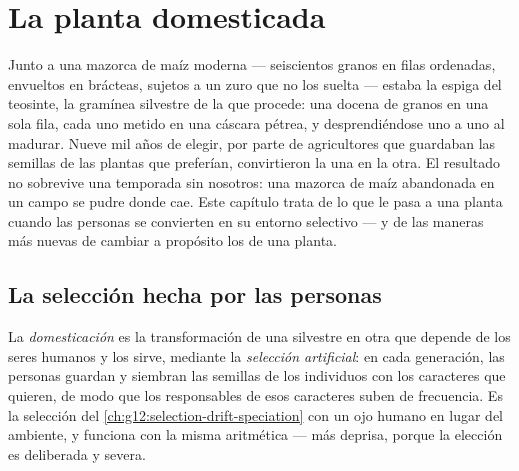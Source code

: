 \chapter{La planta domesticada}\label{ch:g12:domesticated-plants}

Junto a una mazorca de maíz moderna --- seiscientos granos en filas
ordenadas, envueltos en brácteas, sujetos a un zuro que no los suelta
--- estaba la espiga del teosinte, la gramínea silvestre de la que
procede: una docena de granos en una sola fila, cada uno metido en una
cáscara pétrea, y desprendiéndose uno a uno al madurar. Nueve mil años
de elegir, por parte de agricultores que guardaban las semillas de las
plantas que preferían, convirtieron la una en la otra. El resultado no
sobrevive una temporada sin nosotros: una mazorca de maíz abandonada en
un campo se pudre donde cae. Este capítulo trata de lo que le pasa a
una planta cuando las personas se convierten en su entorno selectivo
--- y de las maneras más nuevas de cambiar a propósito los  de una
planta.

\section{La selección hecha por las personas}

\begin{definition}\label{def:g12:domesticated-plants:domestication}
La \emph{domesticación} es la transformación de
una  silvestre en otra que depende de los seres humanos y los
sirve, mediante la \emph{selección artificial}: en cada generación, las personas guardan y siembran las
semillas de los individuos con los caracteres que quieren, de modo que
los  responsables de esos caracteres suben de frecuencia. Es la
selección del \cref{ch:g12:selection-drift-speciation} con un ojo
humano en lugar del ambiente, y funciona con la misma aritmética ---
más deprisa, porque la elección es deliberada y severa.
\end{definition}

